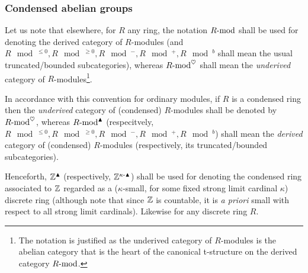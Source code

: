         \subsubsection{Condensed abelian groups}
            \begin{convention} \label{conv: derived_categories_of_condensed_modules}
                Let us note that elsewhere, for $R$ any ring, the notation $R\mod$ shall be used for denoting the derived category of $R$-modules (and $R\mod^{\leq 0}, R\mod^{\geq 0}, R\mod^-, R\mod^+, R\mod^b$ shall mean the usual truncated/bounded subcategories), whereas $R\mod^{\heart}$ shall mean the \textit{underived} category of $R$-modules\footnote{The notation is justified as the underived category of $R$-modules is the abelian category that is the heart of the canonical t-structure on the derived category $R\mod$.}. 
                
                In accordance with this convention for ordinary modules, if $R$ is a condensed ring then the \textit{underived} category of (condensed) $R$-modules shall be denoted by $R\mod^{\heart}$, whereas $R\mod^{\cond}$ (respecitvely, $R\mod^{\leq 0}, R\mod^{\geq 0}, R\mod^-, R\mod^+, R\mod^b$) shall mean the \textit{derived} category of (condensed) $R$-modules (respectively, its truncated/bounded subcategories).
            \end{convention}
            \begin{convention}
                Henceforth, $\Z^{\cond}$ (respectively, $\Z^{\kappa\-\cond}$) shall be used for denoting the condensed ring associated to $\Z$ regarded as a ($\kappa$-small, for some fixed strong limit cardinal $\kappa$) discrete ring (although note that since $\Z$ is countable, it is \textit{a priori} small with respect to all strong limit cardinals). Likewise for any discrete ring $R$.
            \end{convention}
            
